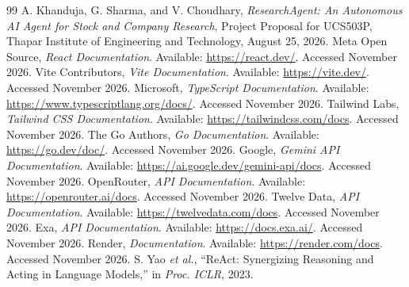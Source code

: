\documentclass[12pt,a4paper,oneside]{report}
\begin{document}
\begin{thebibliography}{99}
 A. Khanduja, G. Sharma, and V. Choudhary, \textit{ResearchAgent: An Autonomous AI Agent for Stock and Company Research}, Project Proposal for UCS503P, Thapar Institute of Engineering and Technology, August 25, 2026.
 Meta Open Source, \textit{React Documentation}. Available: \url{https://react.dev/}. Accessed November 2026.
 Vite Contributors, \textit{Vite Documentation}. Available: \url{https://vite.dev/}. Accessed November 2026.
 Microsoft, \textit{TypeScript Documentation}. Available: \url{https://www.typescriptlang.org/docs/}. Accessed November 2026.
 Tailwind Labs, \textit{Tailwind CSS Documentation}. Available: \url{https://tailwindcss.com/docs}. Accessed November 2026.
 The Go Authors, \textit{Go Documentation}. Available: \url{https://go.dev/doc/}. Accessed November 2026.
 Google, \textit{Gemini API Documentation}. Available: \url{https://ai.google.dev/gemini-api/docs}. Accessed November 2026.
 OpenRouter, \textit{API Documentation}. Available: \url{https://openrouter.ai/docs}. Accessed November 2026.
 Twelve Data, \textit{API Documentation}. Available: \url{https://twelvedata.com/docs}. Accessed November 2026.
 Exa, \textit{API Documentation}. Available: \url{https://docs.exa.ai/}. Accessed November 2026.
 Render, \textit{Documentation}. Available: \url{https://render.com/docs}. Accessed November 2026.
 S. Yao \textit{et al.}, ``ReAct: Synergizing Reasoning and Acting in Language Models,'' in \textit{Proc. ICLR}, 2023.
\end{thebibliography}
\end{document}
